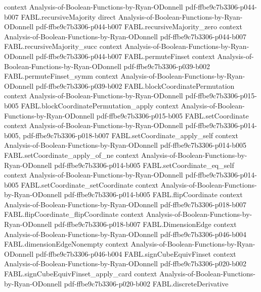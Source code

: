 \begin{theorem}
  {context}
  {Analysis-of-Boolean-Functions-by-Ryan-ODonnell}
  {pdf-ffbe9c7b3306-p044-b007}
\proofstep
  {FABL.recursiveMajority}
  {direct}
  {Analysis-of-Boolean-Functions-by-Ryan-ODonnell}
  {pdf-ffbe9c7b3306-p044-b007}
\proofstep
  {FABL.recursiveMajority_zero}
  {context}
  {Analysis-of-Boolean-Functions-by-Ryan-ODonnell}
  {pdf-ffbe9c7b3306-p044-b007}
\proofstep
  {FABL.recursiveMajority_succ}
  {context}
  {Analysis-of-Boolean-Functions-by-Ryan-ODonnell}
  {pdf-ffbe9c7b3306-p044-b007}
\proofstep
  {FABL.permuteFinset}
  {context}
  {Analysis-of-Boolean-Functions-by-Ryan-ODonnell}
  {pdf-ffbe9c7b3306-p039-b002}
\proofstep
  {FABL.permuteFinset_symm}
  {context}
  {Analysis-of-Boolean-Functions-by-Ryan-ODonnell}
  {pdf-ffbe9c7b3306-p039-b002}
\proofstep
  {FABL.blockCoordinatePermutation}
  {context}
  {Analysis-of-Boolean-Functions-by-Ryan-ODonnell}
  {pdf-ffbe9c7b3306-p015-b005}
\proofstep
  {FABL.blockCoordinatePermutation_apply}
  {context}
  {Analysis-of-Boolean-Functions-by-Ryan-ODonnell}
  {pdf-ffbe9c7b3306-p015-b005}
\proofstep
  {FABL.setCoordinate}
  {context}
  {Analysis-of-Boolean-Functions-by-Ryan-ODonnell}
  {pdf-ffbe9c7b3306-p014-b005,
    pdf-ffbe9c7b3306-p018-b007}
\proofstep
  {FABL.setCoordinate_apply_self}
  {context}
  {Analysis-of-Boolean-Functions-by-Ryan-ODonnell}
  {pdf-ffbe9c7b3306-p014-b005}
\proofstep
  {FABL.setCoordinate_apply_of_ne}
  {context}
  {Analysis-of-Boolean-Functions-by-Ryan-ODonnell}
  {pdf-ffbe9c7b3306-p014-b005}
\proofstep
  {FABL.setCoordinate_eq_self}
  {context}
  {Analysis-of-Boolean-Functions-by-Ryan-ODonnell}
  {pdf-ffbe9c7b3306-p014-b005}
\proofstep
  {FABL.setCoordinate_setCoordinate}
  {context}
  {Analysis-of-Boolean-Functions-by-Ryan-ODonnell}
  {pdf-ffbe9c7b3306-p014-b005}
\proofstep
  {FABL.flipCoordinate}
  {context}
  {Analysis-of-Boolean-Functions-by-Ryan-ODonnell}
  {pdf-ffbe9c7b3306-p018-b007}
\proofstep
  {FABL.flipCoordinate_flipCoordinate}
  {context}
  {Analysis-of-Boolean-Functions-by-Ryan-ODonnell}
  {pdf-ffbe9c7b3306-p018-b007}
\proofstep
  {FABL.DimensionEdge}
  {context}
  {Analysis-of-Boolean-Functions-by-Ryan-ODonnell}
  {pdf-ffbe9c7b3306-p046-b004}
\proofstep
  {FABL.dimensionEdgeNonempty}
  {context}
  {Analysis-of-Boolean-Functions-by-Ryan-ODonnell}
  {pdf-ffbe9c7b3306-p046-b004}
\proofstep
  {FABL.signCubeEquivFinset}
  {context}
  {Analysis-of-Boolean-Functions-by-Ryan-ODonnell}
  {pdf-ffbe9c7b3306-p020-b002}
\proofstep
  {FABL.signCubeEquivFinset_apply_card}
  {context}
  {Analysis-of-Boolean-Functions-by-Ryan-ODonnell}
  {pdf-ffbe9c7b3306-p020-b002}
\proofstep
  {FABL.discreteDerivative}

\end{theorem}
